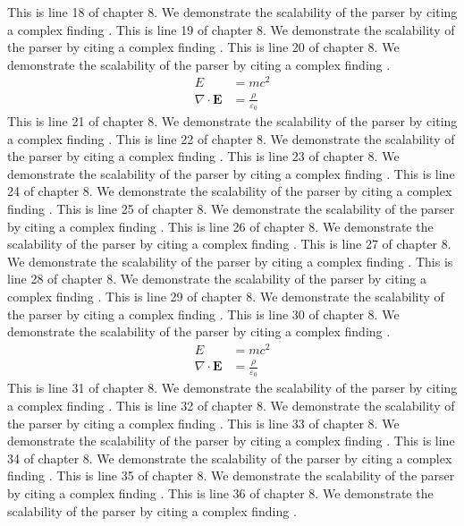 This is line 18 of chapter 8. We demonstrate the scalability of the parser by citing a complex finding \cite{ref8_18}.
This is line 19 of chapter 8. We demonstrate the scalability of the parser by citing a complex finding \cite{ref8_19}.
This is line 20 of chapter 8. We demonstrate the scalability of the parser by citing a complex finding \cite{ref8_20}.
\begin{align*}
  E &= mc^2 \\
  \nabla \cdot \mathbf{E} &= \frac{\rho}{\varepsilon_0}
\end{align*}
This is line 21 of chapter 8. We demonstrate the scalability of the parser by citing a complex finding \cite{ref8_21}.
This is line 22 of chapter 8. We demonstrate the scalability of the parser by citing a complex finding \cite{ref8_22}.
This is line 23 of chapter 8. We demonstrate the scalability of the parser by citing a complex finding \cite{ref8_23}.
This is line 24 of chapter 8. We demonstrate the scalability of the parser by citing a complex finding \cite{ref8_24}.
This is line 25 of chapter 8. We demonstrate the scalability of the parser by citing a complex finding \cite{ref8_25}.
This is line 26 of chapter 8. We demonstrate the scalability of the parser by citing a complex finding \cite{ref8_26}.
This is line 27 of chapter 8. We demonstrate the scalability of the parser by citing a complex finding \cite{ref8_27}.
This is line 28 of chapter 8. We demonstrate the scalability of the parser by citing a complex finding \cite{ref8_28}.
This is line 29 of chapter 8. We demonstrate the scalability of the parser by citing a complex finding \cite{ref8_29}.
This is line 30 of chapter 8. We demonstrate the scalability of the parser by citing a complex finding \cite{ref8_30}.
\begin{align*}
  E &= mc^2 \\
  \nabla \cdot \mathbf{E} &= \frac{\rho}{\varepsilon_0}
\end{align*}
This is line 31 of chapter 8. We demonstrate the scalability of the parser by citing a complex finding \cite{ref8_31}.
This is line 32 of chapter 8. We demonstrate the scalability of the parser by citing a complex finding \cite{ref8_32}.
This is line 33 of chapter 8. We demonstrate the scalability of the parser by citing a complex finding \cite{ref8_33}.
This is line 34 of chapter 8. We demonstrate the scalability of the parser by citing a complex finding \cite{ref8_34}.
This is line 35 of chapter 8. We demonstrate the scalability of the parser by citing a complex finding \cite{ref8_35}.
This is line 36 of chapter 8. We demonstrate the scalability of the parser by citing a complex finding \cite{ref8_36}.
